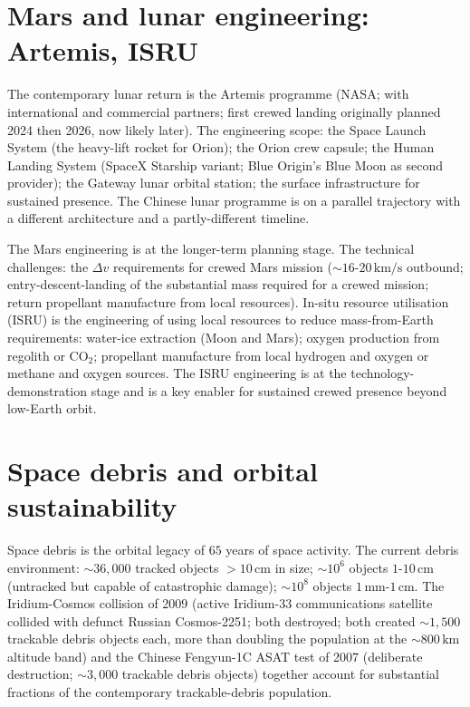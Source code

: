 \section{Mars and lunar engineering: Artemis, ISRU}

The contemporary lunar return is the Artemis programme (NASA; with international and commercial partners; first crewed landing originally planned 2024 then 2026, now likely later). The engineering scope: the Space Launch System (the heavy-lift rocket for Orion); the Orion crew capsule; the Human Landing System (SpaceX Starship variant; Blue Origin's Blue Moon as second provider); the Gateway lunar orbital station; the surface infrastructure for sustained presence. The Chinese lunar programme is on a parallel trajectory with a different architecture and a partly-different timeline.

The Mars engineering is at the longer-term planning stage. The technical challenges: the $\Delta v$ requirements for crewed Mars mission ($\sim 16$-$20\,\text{km/s}$ outbound; entry-descent-landing of the substantial mass required for a crewed mission; return propellant manufacture from local resources). In-situ resource utilisation (ISRU) is the engineering of using local resources to reduce mass-from-Earth requirements: water-ice extraction (Moon and Mars); oxygen production from regolith or CO$_2$; propellant manufacture from local hydrogen and oxygen or methane and oxygen sources. The ISRU engineering is at the technology-demonstration stage and is a key enabler for sustained crewed presence beyond low-Earth orbit.

\section{Space debris and orbital sustainability}

Space debris is the orbital legacy of $65$ years of space activity. The current debris environment: $\sim 36{,}000$ tracked objects $>10\,\text{cm}$ in size; $\sim 10^6$ objects $1$-$10\,\text{cm}$ (untracked but capable of catastrophic damage); $\sim 10^8$ objects $1\,\text{mm}$-$1\,\text{cm}$. The Iridium-Cosmos collision of 2009 \cite{paper:weeden-iridium-cosmos-2010} (active Iridium-33 communications satellite collided with defunct Russian Cosmos-2251; both destroyed; both created $\sim 1{,}500$ trackable debris objects each, more than doubling the population at the $\sim 800\,\text{km}$ altitude band) and the Chinese Fengyun-1C ASAT test of 2007 (deliberate destruction; $\sim 3{,}000$ trackable debris objects) together account for substantial fractions of the contemporary trackable-debris population.

